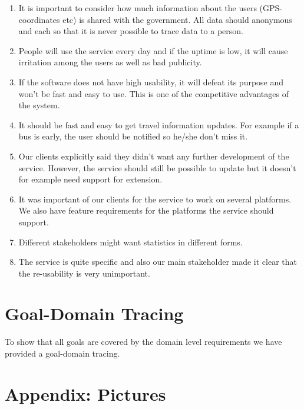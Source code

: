 \documentclass[a4paper]{article}
\begin{document}
		\begin{enumerate}
  			\item It is important to consider how much information about the users (GPS-coordinates etc) is shared with the government.	All data should anonymous and each so that it is never possible to trace data to a person.
  			\item People will use the service every day and if the uptime is low, it will cause irritation among the users as well as bad publicity.
  			\item If the software does not have high usability, it will defeat its purpose and won't be fast and easy to use. This is one of the competitive advantages of the system.
  			\item It should be fast and easy to get travel information updates. For example if a bus is early, the user should be notified so he/she don't miss it.
  			\item Our clients explicitly said they didn't want any further development of the service. However, the service should still be possible to update but it doesn't for example need support for extension.
  			\item It was important of our clients for the service to work on several platforms. We also have feature requirements for the platforms the service should support.
  			\item Different stakeholders might want statistics in different forms.
  			\item The service is quite specific and also our main stakeholder made it clear that the re-usability is very unimportant.	
		\end{enumerate}

	
	\section{Goal-Domain Tracing}
	 To show that all goals are covered by the domain level requirements we have provided a goal-domain tracing. \\
				
		
	\section{Appendix: Pictures} %
		\label{sec:appendix}
		
\end{document}
